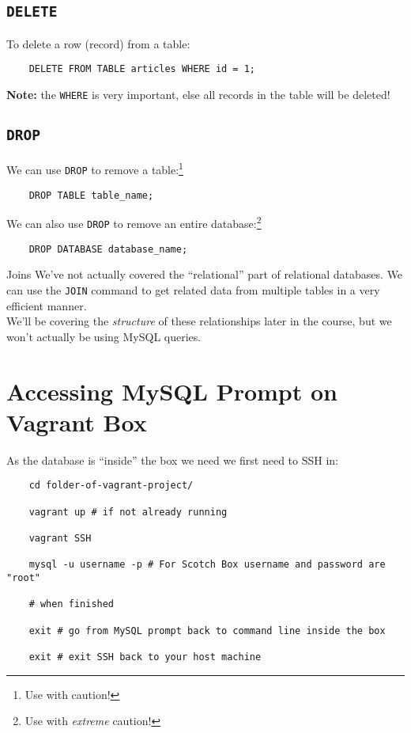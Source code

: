 \subsection{\texttt{DELETE}}

To delete a row (record) from a table:

\begin{verbatim}
    DELETE FROM TABLE articles WHERE id = 1;
\end{verbatim}

\textbf{Note:} the \texttt{WHERE} is very important, else all records in the table will be deleted!

\subsection{\texttt{DROP}}

We can use \texttt{DROP} to remove a table:\footnote{Use with caution!}

\begin{verbatim}
    DROP TABLE table_name;
\end{verbatim}

We can also use \texttt{DROP} to remove an entire database:\footnote{Use with \textit{extreme} caution!}

\begin{verbatim}
    DROP DATABASE database_name;
\end{verbatim}

\begin{infobox}{Joins}
    We've not actually covered the ``relational'' part of relational databases. We can use the \texttt{JOIN} command to get related data from multiple tables in a very efficient manner.
    \\

    We'll be covering the \textit{structure} of these relationships later in the course, but we won't actually be using MySQL queries.
\end{infobox}

\section{Accessing MySQL Prompt on Vagrant Box}

As the database is ``inside'' the box we need we first need to SSH in:

\begin{verbatim}
    cd folder-of-vagrant-project/

    vagrant up # if not already running

    vagrant SSH

    mysql -u username -p # For Scotch Box username and password are "root"

    # when finished

    exit # go from MySQL prompt back to command line inside the box

    exit # exit SSH back to your host machine

\end{verbatim}

